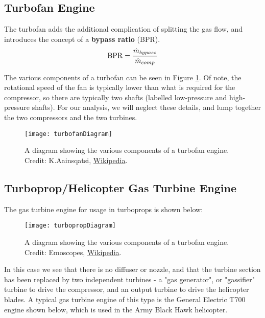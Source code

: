 


\subsection{Turbofan Engine}
The turbofan adds the additional complication of splitting the gas flow, and introduces the concept of a {\bf bypass ratio} (BPR).
\begin{equation*}
  {\rm BPR} = \frac{\dot{m}_{bypass}}{\dot{m}_{comp}}
\end{equation*}

The various components of a turbofan can be seen in Figure \ref{fig:turbofan}.  Of note, the rotational speed of the fan is typically lower than what is required for the compressor, so there are typically two shafts (labelled low-pressure and high-pressure shafts).  For our analysis, we will neglect these details, and lump together the two compressors and the two turbines.

\begin{figure}[H]
  \centering
  \texttt{[image: turbofanDiagram]}
  \caption{A diagram showing the various components of a turbofan engine. Credit: K.Aainsqatsi, \href{https://commons.wikimedia.org/wiki/File:Turbofan_operation_lbp.svg}{Wikipedia}.}
  \label{fig:turbofan}
\end{figure}



\subsection{Turboprop/Helicopter Gas Turbine Engine}
The gas turbine engine for usage in turboprops is shown below:

\begin{figure}[H]
  \centering
  \texttt{[image: turbopropDiagram]}
  \caption{A diagram showing the various components of a turbofan engine. Credit: Emoscopes, \href{https://commons.wikimedia.org/wiki/File:Turboprop_operation-en.svg}{Wikipedia}.}
  \label{fig:turboprop}
\end{figure}

In this case we see that there is no diffuser or nozzle, and that the turbine section has been replaced by two independent turbines - a "gas generator", or "gassifier" turbine to drive the compressor, and an output turbine to drive the helicopter blades. A typical gas turbine engine of this type is the General Electric T700 engine shown below, which is used in the Army Black Hawk helicopter.

